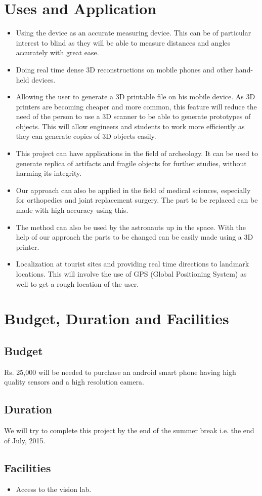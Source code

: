 \documentclass{article}
\begin{document}
	
	

	\section{Uses and Application}
			\begin{itemize}
				\item Using the device as an accurate measuring device. This can be of particular interest to blind as they will be able to measure distances and angles accurately with great ease.
				\item Doing real time dense 3D reconstructions on mobile phones and other hand-held devices. 
				\item Allowing the user to generate a 3D printable file on his mobile device. As 3D printers are becoming cheaper and more common, this feature will reduce the need of the person to use a 3D scanner to be able to generate prototypes of objects. This will allow engineers and students to work more efficiently as they can generate copies of 3D objects easily.
				\item This project can have applications in the field of archeology. It can be used to generate replica of artifacts and fragile objects for further studies, without harming its integrity.
				\item Our approach can also be applied in the field of medical sciences, especially for orthopedics and joint replacement surgery. The part to be replaced can be made with high accuracy using this.
				\item The method can also be used by the astronauts up in the space. With the help of our approach the parts to be changed can be easily made using a 3D printer.
				\item Localization at tourist sites and providing real time directions to landmark locations. This will involve the use of GPS (Global Positioning System) as well to get a rough location of the user.
			\end{itemize}
	\newpage
	\section{Budget, Duration and Facilities}	
		\subsection{Budget}
			Rs. 25,000 will be needed to purchase an android smart phone having high quality sensors and a high resolution camera.
		\subsection{Duration}
			We will try to complete this project by the end of the summer break i.e. the end of July, 2015. 
		\subsection{Facilities}
		    \begin{itemize}
		    \item Access to the vision lab.
		    \end{itemize}
\end{document}
